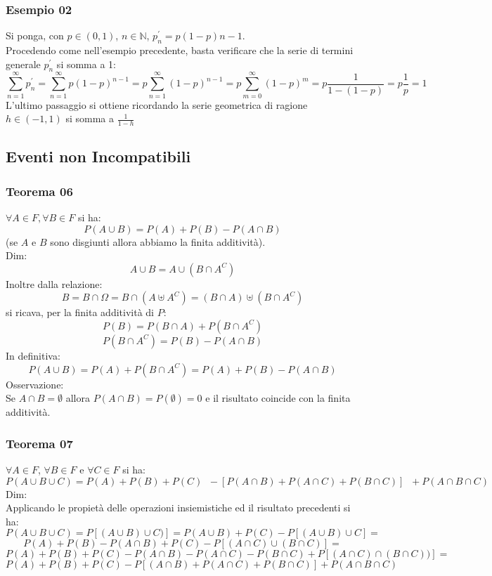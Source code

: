 \subsubsection{Esempio 02}
Si ponga, con $\textit{p} \in (0,1)$, $n \in \mathbb{N}$, $\textit{p}^{\prime}_n = \textit{p} (1-\textit{p}){n-1}$.\\
Procedendo come nell'esempio precedente, basta verificare che la serie di termini generale $\textit{p}^{\prime}_n$ si somma a 1:
$$  \sum_{n=1}^{\infty} \textit{p}^{\prime}_n = \sum_{n=1}^{\infty} \textit{p} (1- \textit{p})^{n-1} = \textit{p} \sum_{n=1}^{\infty} (1-\textit{p})^{n-1} = \textit{p} \sum_{m=0}^{\infty}  (1-\textit{p})^m = \textit{p} \frac{1}{1-(1-\textit{p})} = \textit{p} \frac{1}{\textit{p}} = 1$$
L'ultimo passaggio si ottiene ricordando la serie geometrica di ragione $h \in (-1,1)$ si somma a $\frac{1}{1-h}$

\subsection{Eventi non Incompatibili}
\subsubsection{Teorema 06}
$ \forall A \in F, \forall B \in F $ si ha:
$$ P(A \cup B) = P(A) + P(B) - P(A \cap B)$$
(se $A$ e $B$ sono disgiunti allora abbiamo la finita additività).\\
Dim: 
$$ A \cup B = A \cup (B \cap A^C) $$
Inoltre dalla relazione:
$$ B=B \cap \Omega = B \cap (A \uplus A^C) = (B \cap A) \uplus (B \cap A^C)$$
si ricava, per la finita additività di $P$:
$$ P(B) = P(B \cap A) + P(B \cap A^C)$$
$$ P(B \cap A^C) = P(B) - P(A \cap B)$$
In definitiva:
$$ P(A \cup B) = P(A) + P(B \cap A^C) = P(A) + P(B) - P(A \cap B)$$
Osservazione:\\
Se $A \cap B = \emptyset$ allora $P(A \cap B) = P(\emptyset) = 0$ e il risultato coincide con la finita additività.

\subsubsection{Teorema 07}
$\forall A \in F$, $\forall B \in F$ e $\forall C \in F$ si ha:
$$ P(A \cup B \cup C) = P(A) + P(B) + P(C) \;\; - [P(A \cap B) + P(A \cap C) + P(B \cap C)] \;\; + P(A \cap B \cap C)$$
Dim: \\
Applicando le propietà delle operazioni insiemistiche ed il risultato precedenti si ha:
$$ P(A \cup B \cup C) = P[(A \cup B) \cup C)] = P(A \cup B) + P(C) - P[(A \cup B) \cup C] = $$
$$ P(A) + P(B) - P(A \cap B) + P(C) - P[(A \cap C) \cup (B \cap C)]  = $$
$$ P(A) + P(B) + P(C) - P(A \cap B) - P(A \cap C) - P(B \cap C) + P[(A \cap C) \cap (B \cap C))] = $$
$$ P(A) + P(B) +P(C) - P[(A \cap B) + P (A \cap C) + P(B \cap C)] + P(A \cap B \cap C)$$

